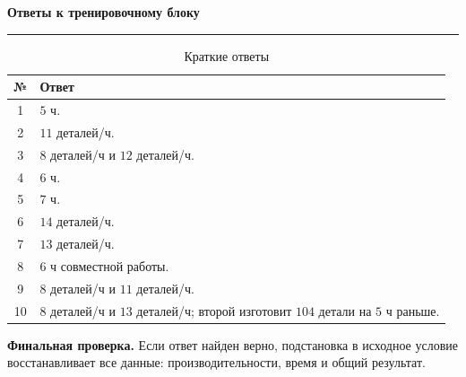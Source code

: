 \documentclass[a4paper,12pt]{article}
\newcommand{\lessonsection}[1]{%
  \vspace{0.35em}
  {\Large\bfseries\textcolor{darkaccent}{#1}}\par
  \vspace{0.2em}
  {\color{accent}\rule{\linewidth}{0.6pt}}\par
  \vspace{0.4em}
}
\begin{document}
\clearpage

\lessonsection{Ответы к тренировочному блоку}

\begin{table}[ht]
\centering
\caption{Краткие ответы}

\begin{tabularx}{0.92\linewidth}{@{}cX@{}}
\toprule
\textbf{№} & \textbf{Ответ} \\
\midrule

1 & $5$ ч. \\

2 & $11$ деталей/ч. \\

3 & $8$ деталей/ч и $12$ деталей/ч. \\

4 & $6$ ч. \\

5 & $7$ ч. \\

6 & $14$ деталей/ч. \\

7 & $13$ деталей/ч. \\

8 & $6$ ч совместной работы. \\

9 & $8$ деталей/ч и $11$ деталей/ч. \\

10 &
$8$ деталей/ч и $13$ деталей/ч;
второй изготовит $104$ детали на $5$ ч раньше.
\\

\bottomrule
\end{tabularx}
\end{table}

\vspace{1em}

\textbf{Финальная проверка.}
Если ответ найден верно,
подстановка в исходное условие восстанавливает
все данные: производительности, время
и общий результат.
\end{document}
